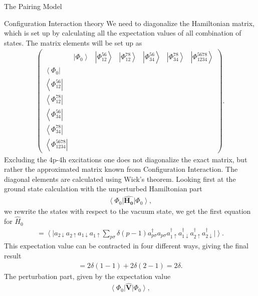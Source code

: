 \documentclass[twoside,english]{uiofysmaster}
\begin{document}
\begin{chapter}{The Pairing Model}
\begin{section}{Configuration Interaction theory}
	 	We need to diagonalize the Hamiltonian matrix, which is set up by calculating all the expectation values of all combination of states. The matrix elements will be set up as
		\begin{align}
			\begin{pmatrix}
				& \left| \Phi_0 \right> & \left| \Phi_{12}^{56} \right> & \left| \Phi_{12}^{78} \right> & \left| \Phi_{34}^{56} \right> & \left| \Phi_{34}^{78} \right> & \left| \Phi_{1234}^{5678} \right> \\ 
				\left< \Phi_0 \right| &   &   &   &   &   & \\
				\left< \Phi_{12}^{56} \right| &   &   &   &   &   & \\
				\left< \Phi_{12}^{78} \right| &   &   &   &   &   & \\
				\left< \Phi_{34}^{56} \right| &   &   &   &   &   & \\
				\left< \Phi_{34}^{78} \right| &   &   &   &   &   & \\
				\left< \Phi_{1234}^{5678} \right| &   &   &   &   &   & 
			\end{pmatrix}.
		\end{align}
		Excluding the 4p-4h excitations one does not diagonalize the exact matrix, but rather the approximated matrix known from Configuration Interaction. 
		The diagonal elements are calculated using Wick's theorem. Looking first at the ground state calculation with the unperturbed Hamiltonian part
		\begin{align}
			\left< \Phi_0 \right| \hat{\mathbf{H_0}} \left| \Phi_0 \right>,
		\end{align}
		we rewrite the states with respect to the vacuum state, we get the first equation for $\hat H_0$
		\begin{align}
			= \left< \right|  a_{2 \downarrow}  a_{2 \uparrow} a_{1 \downarrow} a_{1 \uparrow} \sum_{p \sigma} \delta (p-1) a_{p \sigma}^{\dagger} a_{p \sigma} 
			a_{1 \uparrow}^{\dagger} a_{1 \downarrow}^{\dagger} a_{2 \uparrow}^{\dagger} a_{2 \downarrow}^{\dagger} \left| \right>.
		\end{align}
		This expectation value can be contracted in four different ways, giving the final result 
		\begin{align}
			= 2 \delta (1-1) + 2 \delta (2-1) = 2 \delta.
		\end{align}
		The perturbation part, given by the expectation value 
		\begin{align}
			\left< \Phi_0 \right| \hat{\mathbf{V}} \left| \Phi_0 \right>,
		\end{align}

\end{section}
\end{chapter}
\end{document}
